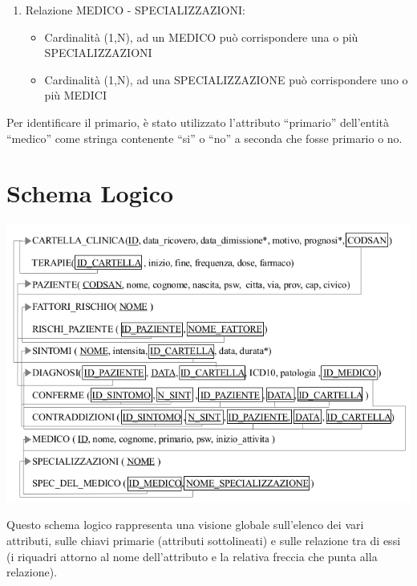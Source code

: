 \documentclass[a4paper,titlepage]{article}
\begin{document}
\begin{enumerate}
\item Relazione MEDICO - SPECIALIZZAZIONI:

\begin{itemize}[leftmargin=0.5cm, topsep=0.25cm, itemsep=0.2cm]

\item Cardinalità (1,N), ad un MEDICO può corrispondere una o più SPECIALIZZAZIONI
\item Cardinalità (1,N), ad una SPECIALIZZAZIONE può corrispondere uno o più MEDICI

\end{itemize}

\end{enumerate}

Per identificare il primario, è stato utilizzato l'attributo ``primario'' dell'entità ``medico'' come stringa contenente ``si'' o ``no'' a seconda che fosse primario o no. 

\newpage

\part{Schema Logico}
 \begin{center}

 \centering
 \includegraphics[scale=0.9]{schema_logico.png}

 \end{center}

Questo schema logico rappresenta una visione globale sull'elenco dei vari attributi, sulle chiavi primarie (attributi sottolineati) e sulle relazione tra di essi (i riquadri attorno al nome dell'attributo e la relativa freccia che punta alla relazione).
\end{document}
